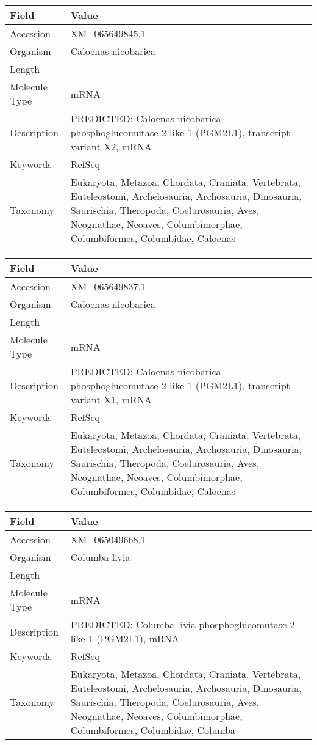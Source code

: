 \documentclass[10pt]{article}
\begin{document}
{\footnotesize
\begin{longtable}{>{\raggedright\arraybackslash}p{4.5cm} >{\raggedright\arraybackslash}p{11.5cm}}
\textbf{Field} & \textbf{Value} \\
\hline
Accession & XM\_065649845.1 \\
Organism & Caloenas nicobarica \\
Length & 5843 \\
Molecule Type & mRNA \\
Description & PREDICTED: Caloenas nicobarica phosphoglucomutase 2 like 1 (PGM2L1), transcript variant X2, mRNA \\
Keywords & RefSeq \\
Taxonomy & Eukaryota, Metazoa, Chordata, Craniata, Vertebrata, Euteleostomi, Archelosauria, Archosauria, Dinosauria, Saurischia, Theropoda, Coelurosauria, Aves, Neognathae, Neoaves, Columbimorphae, Columbiformes, Columbidae, Caloenas \\
\end{longtable}
}

{\footnotesize
\begin{longtable}{>{\raggedright\arraybackslash}p{4.5cm} >{\raggedright\arraybackslash}p{11.5cm}}
\textbf{Field} & \textbf{Value} \\
\hline
Accession & XM\_065649837.1 \\
Organism & Caloenas nicobarica \\
Length & 5988 \\
Molecule Type & mRNA \\
Description & PREDICTED: Caloenas nicobarica phosphoglucomutase 2 like 1 (PGM2L1), transcript variant X1, mRNA \\
Keywords & RefSeq \\
Taxonomy & Eukaryota, Metazoa, Chordata, Craniata, Vertebrata, Euteleostomi, Archelosauria, Archosauria, Dinosauria, Saurischia, Theropoda, Coelurosauria, Aves, Neognathae, Neoaves, Columbimorphae, Columbiformes, Columbidae, Caloenas \\
\end{longtable}
}

{\footnotesize
\begin{longtable}{>{\raggedright\arraybackslash}p{4.5cm} >{\raggedright\arraybackslash}p{11.5cm}}
\textbf{Field} & \textbf{Value} \\
\hline
Accession & XM\_065049668.1 \\
Organism & Columba livia \\
Length & 5769 \\
Molecule Type & mRNA \\
Description & PREDICTED: Columba livia phosphoglucomutase 2 like 1 (PGM2L1), mRNA \\
Keywords & RefSeq \\
Taxonomy & Eukaryota, Metazoa, Chordata, Craniata, Vertebrata, Euteleostomi, Archelosauria, Archosauria, Dinosauria, Saurischia, Theropoda, Coelurosauria, Aves, Neognathae, Neoaves, Columbimorphae, Columbiformes, Columbidae, Columba \\
\end{longtable}
}
\end{document}
